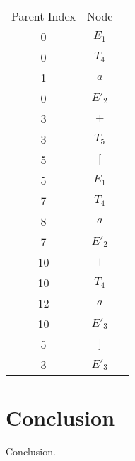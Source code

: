 \documentclass[a4paper,12pt]{article}
\theoremstyle{definition}
\begin{document}
\begin{table}[H]
  \centering
  \begin{tabular}{c|c|c}
    Parent Index & Node \\
    0  &  $E_1$ \\ \hline
    0  &  $T_4$ \\ \hline
    1  &  $a$ \\ \hline
    0  &  $E'_2$ \\ \hline
    3  &  $+$ \\ \hline
    3  &  $T_5$ \\ \hline
    5  &  $[$ \\ \hline
    5  &  $E_1$ \\ \hline
    7  &  $T_4$ \\ \hline
    8  &  $a$ \\ \hline
    7  &  $E'_2$ \\ \hline
    10 &  $+$ \\ \hline
    10 &  $T_4$ \\ \hline
    12 &  $a$ \\ \hline
    10 &  $E'_3$ \\ \hline
    5  &  $]$ \\ \hline
    3  &  $E'_3$
  \end{tabular}
\end{table}

\section{Conclusion}
Conclusion.
\printbibliography
\end{document}
